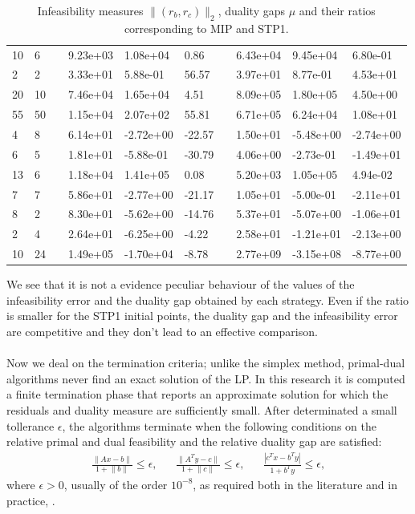 \documentclass[a4paper,10 pt,titlepage,twoside]{book}
\theoremstyle{plain}
\theoremstyle{definition}
\theoremstyle{remark}
\begin{document}
\begin{table}[!h]
\begin{tabular}{llllllllll}
		10 & 6 &  & 9.23e+03 & 1.08e+04 & 0.86 &  & 6.43e+04 & 9.45e+04 & 6.80e-01 \\
		2 & 2 &  & 3.33e+01 & 5.88e-01 & 56.57 &  & 3.97e+01 & 8.77e-01 & 4.53e+01 \\
		20 & 10 &  & 7.46e+04 & 1.65e+04 & 4.51 &  & 8.09e+05 & 1.80e+05 & 4.50e+00 \\
		55 & 50 &  & 1.15e+04 & 2.07e+02 & 55.81 &  & 6.71e+05 & 6.24e+04 & 1.08e+01 \\
		4 & 8 &  & 6.14e+01 & -2.72e+00 & -22.57 &  & 1.50e+01 & -5.48e+00 & -2.74e+00 \\
		6 & 5 &  & 1.81e+01 & -5.88e-01 & -30.79 &  & 4.06e+00 & -2.73e-01 & -1.49e+01 \\
		13 & 6 &  & 1.18e+04 & 1.41e+05 & 0.08 &  & 5.20e+03 & 1.05e+05 & 4.94e-02 \\
		7 & 7 &  & 5.86e+01 & -2.77e+00 & -21.17 &  & 1.05e+01 & -5.00e-01 & -2.11e+01 \\
		8 & 2 &  & 8.30e+01 & -5.62e+00 & -14.76 &  & 5.37e+01 & -5.07e+00 & -1.06e+01 \\
		2 & 4 &  & 2.64e+01 & -6.25e+00 & -4.22 &  & 2.58e+01 & -1.21e+01 & -2.13e+00 \\
		10 & 24 &  & 1.49e+05 & -1.70e+04 & -8.78 &  & 2.77e+09 & -3.15e+08 & -8.77e+00 \\ \hline
	\end{tabular}\caption{Infeasibility measures $\lVert (r_{b}, r_{c})\rVert_{2}$, duality gaps ${\mu}$ and their ratios corresponding to MIP and STP1.}
\end{table}
We see that it is not a evidence peculiar behaviour of the values of the infeasibility error and the duality gap obtained by each strategy. Even if the ratio is smaller for the STP1 initial points, the duality gap and the infeasibility error are competitive and they don't lead to an effective comparison.\\ 
\\
Now we deal on the termination criteria; unlike the simplex method, primal-dual algorithms never find an exact solution of the LP. In this research it is computed a finite termination phase that reports an approximate solution for which the residuals and duality measure are sufficiently small. After determinated a small tollerance $\epsilon$, the algorithms terminate when the following conditions on the relative primal and dual feasibility and the relative duality gap are satisfied:
\begin{align*}
\frac{\lVert Ax -b\rVert}{1+ \lVert b \rVert}\leq \epsilon, && \frac{\lVert A^{T}y -c\rVert}{1 + \lVert c \rVert}\leq \epsilon, &&\frac{|c^{T}x - b^{T}y|}{1+b^{T}y}\leq \epsilon,
\end{align*}
where $\epsilon > 0$, usually of the order $10^{-8}$, as required both in the literature and in practice, \cite{Wright}.
\end{document}
